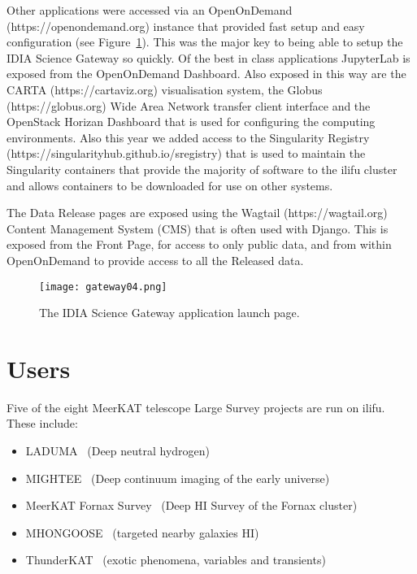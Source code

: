 \documentclass{iau_FM}
\begin{document}
Other applications were accessed via an OpenOnDemand (https://openondemand.org) instance that provided fast
setup and easy configuration (see Figure~\ref{fig:gateway-launch-page}). 
This was the major key to being able to setup the IDIA Science 
Gateway so quickly.
Of the best in class applications JupyterLab is exposed from the OpenOnDemand Dashboard. Also exposed in this
way are the CARTA (https://cartaviz.org) visualisation system, the Globus (https://globus.org)
Wide Area Network transfer client interface and the OpenStack Horizan
Dashboard that is used for configuring the computing environments. Also this year we added access
to the Singularity Registry (https://singularityhub.github.io/sregistry)
 that is used to maintain the Singularity 
containers that provide the majority of software to the ilifu cluster and allows containers to be downloaded
for use on other systems.

The Data Release pages are exposed using the Wagtail (https://wagtail.org) Content Management System (CMS)
that is often used with Django. This is exposed from the Front Page, for access to only public data,
and from within OpenOnDemand to provide access to all the Released data.




\begin{figure}
    \centering
    \texttt{[image: gateway04.png]}
    \label{fig:gateway-launch-page}
\caption{The IDIA Science Gateway application launch page.}
\end{figure}
    






\section{Users}
\label{sec:users}

Five of the eight MeerKAT telescope Large Survey projects are run on ilifu. 
These include:
\begin{itemize}
\item LADUMA~\cite{laduma} (Deep neutral hydrogen)
\item MIGHTEE~\cite{mightee} (Deep continuum imaging of the early universe)
\item MeerKAT Fornax Survey~\cite{formax} (Deep HI Survey of the Fornax cluster)
\item MHONGOOSE~\cite{mongoose} (targeted nearby galaxies HI)
\item ThunderKAT~\cite{thunderkat} (exotic phenomena, variables and transients)
\end{itemize}
\end{document}
